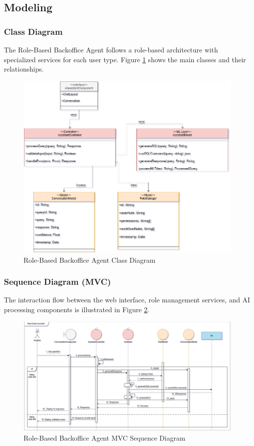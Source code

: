 \subsection{Modeling}
\subsubsection{Class Diagram}
The Role-Based Backoffice Agent follows a role-based architecture with specialized services for each user type. Figure \ref{fig:backoffice-class-diagram} shows the main classes and their relationships.
\newpage
\begin{figure}[htbp]
    \centering
    \includegraphics[width=1\textwidth]{images/backoffice_class_diagram.png}
    \caption{Role-Based Backoffice Agent Class Diagram}
    \label{fig:backoffice-class-diagram}
\end{figure}

\subsubsection{Sequence Diagram (MVC)}
The interaction flow between the web interface, role management services, and AI processing components is illustrated in Figure \ref{fig:backoffice-sequence-mvc}.
\newpage
\begin{figure}[htbp]
    \centering
    \includegraphics[width=1\textwidth]{images/backoffice_sequence_mvc.png}
    \caption{Role-Based Backoffice Agent MVC Sequence Diagram}
    \label{fig:backoffice-sequence-mvc}
\end{figure}

